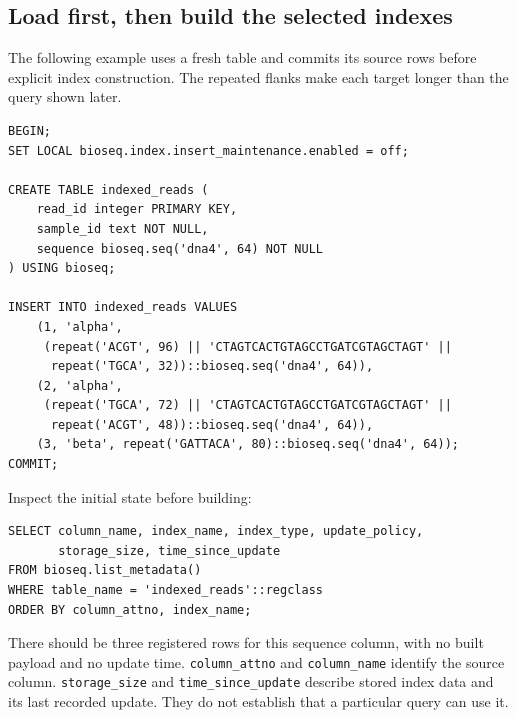 \subsection{Load first, then build the selected indexes}

The following example uses a fresh table and commits its source rows
before explicit index construction. The repeated flanks make each target
longer than the query shown later.

\par\noindent\begin{minipage}{\linewidth}
\begin{lstlisting}[style=bioseq-appendix-sql,
  caption={Load a searchable table without insertion-time indexing.}]
BEGIN;
SET LOCAL bioseq.index.insert_maintenance.enabled = off;

CREATE TABLE indexed_reads (
    read_id integer PRIMARY KEY,
    sample_id text NOT NULL,
    sequence bioseq.seq('dna4', 64) NOT NULL
) USING bioseq;

INSERT INTO indexed_reads VALUES
    (1, 'alpha',
     (repeat('ACGT', 96) || 'CTAGTCACTGTAGCCTGATCGTAGCTAGT' ||
      repeat('TGCA', 32))::bioseq.seq('dna4', 64)),
    (2, 'alpha',
     (repeat('TGCA', 72) || 'CTAGTCACTGTAGCCTGATCGTAGCTAGT' ||
      repeat('ACGT', 48))::bioseq.seq('dna4', 64)),
    (3, 'beta', repeat('GATTACA', 80)::bioseq.seq('dna4', 64));
COMMIT;
\end{lstlisting}
\end{minipage}

Inspect the initial state before building:

\par\noindent\begin{minipage}{\linewidth}
\begin{lstlisting}[style=bioseq-appendix-sql,
  caption={Read the public index metadata.}]
SELECT column_name, index_name, index_type, update_policy,
       storage_size, time_since_update
FROM bioseq.list_metadata()
WHERE table_name = 'indexed_reads'::regclass
ORDER BY column_attno, index_name;
\end{lstlisting}
\end{minipage}

There should be three registered rows for this sequence column, with no
built payload and no update time. \texttt{column\_attno} and
\texttt{column\_name} identify the source column.
\texttt{storage\_size} and \texttt{time\_since\_update} describe stored
index data and its last recorded update. They do not establish that a
particular query can use it.

